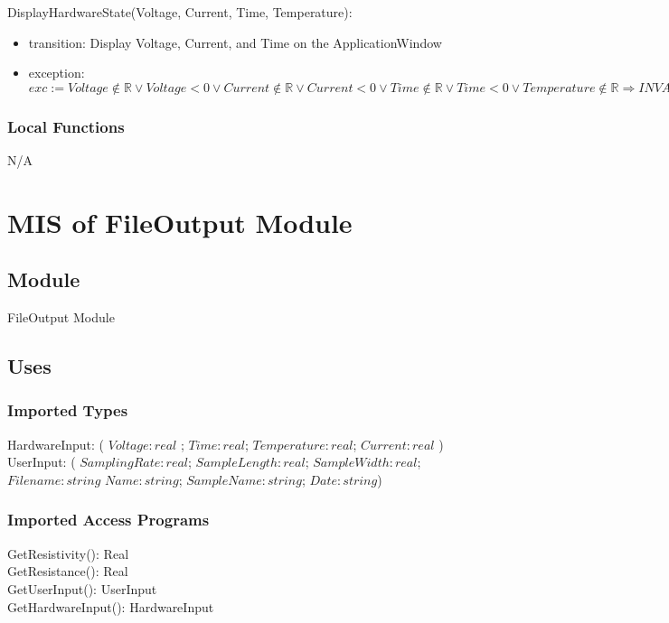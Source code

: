 \documentclass[12pt, titlepage]{article}
\begin{document}
\noindent DisplayHardwareState(Voltage, Current, Time, Temperature):
\begin{itemize}
\item transition: Display Voltage, Current, and Time on the ApplicationWindow
\item exception: $exc:= Voltage \notin  \mathbb{R} \lor Voltage < 0 \lor  Current \notin  \mathbb{R} \lor Current < 0 \lor  Time \notin  \mathbb{R} \lor Time < 0 \lor  Temperature \notin  \mathbb{R} \Rightarrow INVALID$
\end{itemize}

\subsubsection{Local Functions}
N/A

\newpage

\section{MIS of FileOutput Module} \label{FO} 

\subsection{Module}

FileOutput Module

\subsection{Uses}

\subsubsection{Imported Types}

HardwareInput: ( $Voltage: real $ ; $Time: real$; $Temperature: real$; $Current: real$ )\\
UserInput: ( $SamplingRate: real$; $SampleLength: real$; $SampleWidth: real$; $Filename: string$ $Name: string$; $SampleName: string$; $Date: string$)

\subsubsection{Imported Access Programs}
  GetResistivity(): Real\\
  GetResistance(): Real\\
  GetUserInput(): UserInput\\
  GetHardwareInput(): HardwareInput
\end{document}
